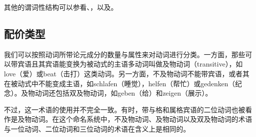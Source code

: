 其他的谓词性结构可以参看、，以及。


\subsection{配价类型}

\addlines
我们可以按照动词所带论元成分的数量与属性来对动词进行分类。一方面，那些可以带宾语且其宾语能变换为被动式的主语多动词叫做及物动词（transitive），如love（爱）或beat（击打）这类动词。另一方面，不及物动词不能带宾语，或者其在被动式中不能变成主语，如schlafen（睡觉），helfen（帮忙）或gedenken（纪念）。及物动词还包括双及物动词，如geben（给）和zeigen（展示）。

不过，这一术语的使用并不完全一致。有时，带与格和属格宾语的二位动词也被看作是及物动词。在这个命名系统中，不及物动词、及物动词以及双及物动词的术语与一位动词、二位动词和三位动词的术语在含义上是相同的。

